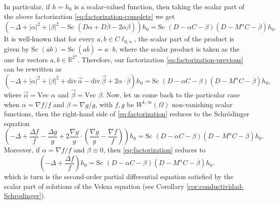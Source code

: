 \documentclass[12pt]{article}
\def\div{\mbox{div}\,}
\begin{document}
In particular, if $h=h_0$ is a scalar-valued function, then taking the scalar part of the above factorization \eqref{eq:factorization-complete} we get 
\begin{equation}\label{eq:factorization-previous}
    \left(-\Delta+|\alpha|^2+|\beta|^2-\text{Sc }(D\alpha+D\overline{\beta}-2\alpha\beta)\right)h_0=\text{Sc } (D-\alpha C-\beta)(D-M^{\alpha}C-\overline{\beta})h_0.
\end{equation}
It is well-known that for every $a, b\in C\ell_{0,n}$, the scalar part of the product is given by $\text{Sc }(\overline{a}b)=\text{Sc }(a\overline{b})=a\cdot b$, where the scalar product is taken as the one for vectors $a,b\in \mathbb{R}^{2^n}$. Therefore, our factorization \eqref{eq:factorization-previous} can be rewritten as
\begin{equation}\label{eq:factorization}
    \left(-\Delta+|\alpha|^2+|\beta|^2+\div \vec \alpha-\div \vec \beta+2\alpha\cdot \overline{\beta}\right)h_0=\text{Sc } (D-\alpha C-\beta)(D-M^{\alpha}C-\overline{\beta})h_0,
\end{equation}
where $\vec \alpha=\text{Vec }\alpha$ and $\vec \beta=\text{Vec }\beta$.
Now, let us come back to the particular case when $\alpha=\nabla f/f$ and $\beta=\nabla g/g$, with $f, g$ be $W^{1,\infty}(\Omega)$ non-vanishing scalar functions, then the right-hand side of \eqref{eq:factorization} reduces to the Schrödinger equation
\begin{equation}\label{eq:Schrodinger-1}
   \left(-\Delta+\dfrac{\Delta f}{f}-\dfrac{\Delta g}{g}+2\dfrac{\nabla g}{g}\cdot \left(\dfrac{\nabla g}{g}-\dfrac{\nabla f}{f}\right)\right)h_0=\text{Sc } (D-\alpha C-\beta)(D-M^{\alpha}C-\overline{\beta})h_0.
\end{equation}
Moreover, if $\alpha=\nabla f/f$ and $\beta\equiv 0$, then \eqref{eq:factorization} reduces to
\[
   \left(-\Delta+\dfrac{\Delta f}{f}\right)h_0=\text{Sc } (D-\alpha C-\beta)(D-M^{\alpha}C-\overline{\beta})h_0.
\]
which is turn is the second-order partial differential equation satisfied by the scalar part of solutions of the Vekua equation (see Corollary \ref{cor:conductividad-Schrodinger}).
\end{document}
